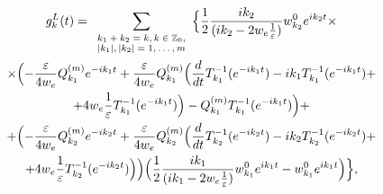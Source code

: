 \begin{multline*}

g^L_k(t)=\sum_{\scriptsize

\begin{array}{c}

 k_1+k_2=k, k\in \mathbb Z_0, \\ |k_1|,|k_2|=1,\dots,m 

\end{array} 

 } \Bigl\{\frac12\frac{ik_2}{(ik_2-2w_e\frac1\varepsilon)}w^0_{k_2}e^{ik_2t}\times

\\

\times \Bigl(-\frac\varepsilon{4w_e}Q_{k_1}^{(m)}e^{-ik_1t}+\frac\varepsilon{4w_e}Q_{k_1}^{(m)}\Bigl(\frac{d}{dt} T_{k_1}^{-1}(e^{-ik_1t})-ik_1T_{k_1}^{-1}(e^{-ik_1t})+

\\

+4w_e\frac1\varepsilon T_{k_1}^{-1}(e^{-ik_1t})\Bigr)-Q_{k_1}^{(m)} T^{-1}_{k_1}(e^{-ik_1t})   \Bigr)+

\\

+ \Bigl(-\frac\varepsilon{4w_e}Q_{k_2}^{(m)}e^{-ik_2t}+\frac\varepsilon{4w_e}Q_{k_2}^{(m)}\Bigl(\frac{d}{dt} T_{k_2}^{-1}(e^{-ik_2t})-ik_2 T_{k_2}^{-1}(e^{-ik_2t})+

\\

+4w_e\frac1\varepsilon T_{k_2}^{-1}(e^{-ik_2t})\Bigr)  \Bigr)\Bigl(\frac12\frac{ik_1}{(ik_1-2w_e\frac1\varepsilon)}w^0_{k_1}e^{ik_1t}- w^0_{k_1} e^{ik_1t}\Bigr)\Bigr\},

\end{multline*}

